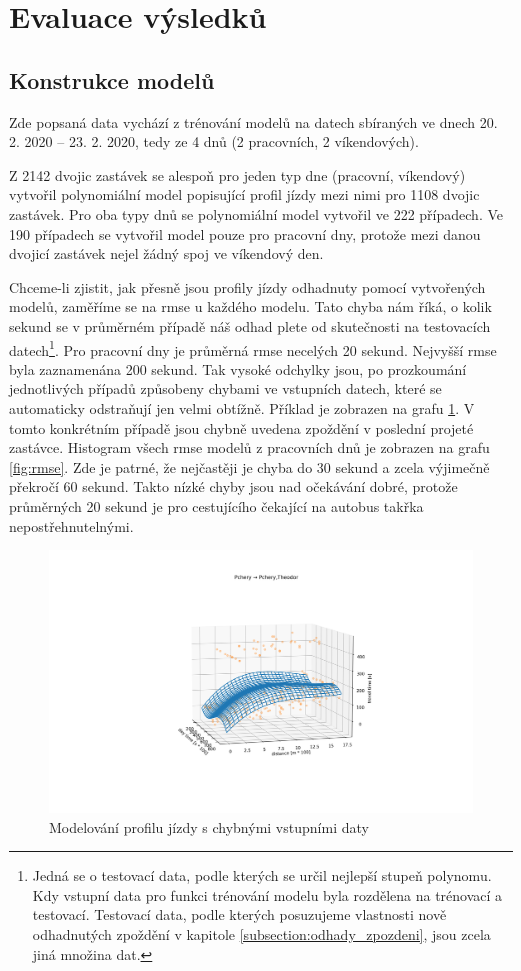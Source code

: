 \section{Evaluace výsledků}


\subsection{Konstrukce modelů}


Zde popsaná data vychází z trénování modelů na datech sbíraných ve dnech 20. 2. 2020 -- 23. 2. 2020, tedy ze 4 dnů (2 pracovních, 2 víkendových).


\bigbreak


Z 2142 dvojic zastávek se alespoň pro jeden typ dne (pracovní, víkendový) vytvořil polynomiální model popisující profil jízdy mezi nimi pro 1108 dvojic zastávek. Pro oba typy dnů se polynomiální model vytvořil ve 222 případech. Ve 190 případech se vytvořil model pouze pro pracovní dny, protože mezi danou dvojicí zastávek nejel žádný spoj ve víkendový den.


\bigbreak


Chceme-li zjistit, jak přesně jsou profily jízdy odhadnuty pomocí vytvořených modelů, zaměříme se na \gls{rmse} u každého modelu. Tato chyba nám říká, o kolik sekund se v průměrném případě náš odhad plete od skutečnosti na testovacích datech\footnote{Jedná se o testovací data, podle kterých se určil nejlepší stupeň polynomu. Kdy vstupní data pro funkci trénování modelu byla rozdělena na trénovací a testovací. Testovací data, podle kterých posuzujeme vlastnosti nově odhadnutých zpoždění v kapitole \ref{subsection:odhady_zpozdeni}, jsou zcela jiná množina dat.}. Pro pracovní dny je průměrná \gls{rmse} necelých 20 sekund. Nejvyšší \gls{rmse} byla zaznamenána 200 sekund. Tak vysoké odchylky jsou, po prozkoumání jednotlivých případů způsobeny chybami ve vstupních datech, které se automaticky odstraňují jen velmi obtížně. Příklad je zobrazen na grafu \ref{fig:chyba_zpozdeni_v_posledni_zastavce}. V tomto konkrétním případě jsou chybně uvedena zpoždění v poslední projeté zastávce. Histogram všech \gls{rmse} modelů z pracovních dnů je zobrazen na grafu \ref{fig:rmse}. Zde je patrné, že nejčastěji je chyba do 30 sekund a zcela výjimečně překročí 60 sekund. Takto nízké chyby jsou nad očekávání dobré, protože průměrných 20 sekund je pro cestujícího čekající na autobus takřka nepostřehnutelnými.


\begin{figure}
   \centering
 \includegraphics[width=0.4\linewidth]{../img/chyba_zpozdeni_v_posledni_zastavce.png}
 \caption{Modelování profilu jízdy s chybnými vstupními daty}
 \label{fig:chyba_zpozdeni_v_posledni_zastavce}
\end{figure}


